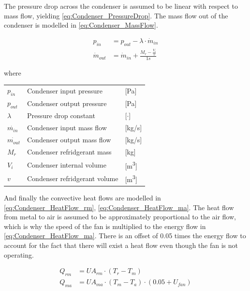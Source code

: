 The pressure drop across the condenser is assumed to be linear with respect to mass flow, yielding \cref{eq:Condenser_PressureDrop}.
The mass flow out of the condenser is modelled in \cref{eq:Condenser_MassFlow}.


\begin{align}
	p_{in} 	& =  p_{out} - \lambda \cdot \dot{m}_{in}  				\label{eq:Condenser_PressureDrop}\\
	\dot{m}_{out}		& = \dot{m}_{in} + \frac{M_r - \frac{V_i}{v}}{1s}		\label{eq:Condenser_MassFlow}
\end{align}

where

\begin{center}
	\begin{tabular}{l p{8cm} l}
		$p_{in}$				&	Condenser input pressure					& [\si{Pa}] \\
		$p_{out}$				&	Condenser output pressure					& [\si{Pa}] \\
		$\lambda$				& 	Pressure drop constant	 					& [$\cdot$] \\
		$\dot{m_{in}}$			& 	Condenser input mass flow 					& [\si{kg}/\si{s}] \\
		$\dot{m_{out}}$			& 	Condenser output mass flow 					& [\si{kg}/\si{s}] \\
		$M_{r}$					&	Condenser refridgerant mass					& [\si{kg}] \\
		$V_{i}$					&	Condenser internal volume					& [\si{m^3}] \\
		$v$						&	Condenser refridgerant volume				& [\si{m^3}] \\
	\end{tabular}
\end{center}


And finally the convective heat flows are modelled in \cref{eq:Condenser_HeatFlow_rm}, \cref{eq:Condenser_HeatFlow_ma}. The heat flow from metal to air is assumed to be approximately proportional to the air flow, which is why the speed of the fan is multiplied to the energy flow in \cref{eq:Condenser_HeatFlow_ma}. There is an offset of 0.05 times the energy flow to account for the fact that there will exist a heat flow even though the fan is not operating.

\begin{align}
	Q_{rm}	 			& = U A_{rm} \cdot (T_r - T_m)							\label{eq:Condenser_HeatFlow_rm}\\
	Q_{ma}	 			& = U A_{ma} \cdot (T_m - T_a)\cdot (0.05 + U_{fan})				\label{eq:Condenser_HeatFlow_ma}
\end{align}

